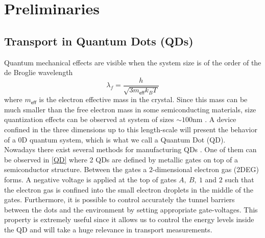 \chapter{Preliminaries}




\section{Transport in Quantum Dots (QDs)}



Quantum mechanical effects are visible when the system size is of
the order of the de Broglie wavelength \citep[(1.1)]{bimberg_quantum_1999}
\[
\lambda_{f}=\frac{h}{\sqrt{3m_{\mathsf{eff}}k_{B}T}}
\]
 where $m_{\mathsf{eff}}$ is the electron effective mass in the crystal.
Since this mass can be much smaller than the free electron mass in
some semiconducting materials, size quantization effects can be observed
at system of sizes $\sim100\mbox{nm}$ \citep[2.1]{sindel_numerical_2005}.
A device confined in the three dimensions up to this length-scale
will present the behavior of a $0$D quantum system, which is what
we call a Quantum Dot (QD).\\

Nowadays there exist several methods for manufacturing QDs \citep{bimberg_quantum_1999}.
One of them can be observed in \ref{QD} where 2 QDs are defined by
metallic gates on top of a semiconductor structure. Between the gates
a $2$-dimensional electron gas (2DEG) forms. A negative voltage is
applied at the top of gates $A,\ B,\ 1$ and $2$ such that the electron
gas is confined into the small electron droplets in the middle of
the gates. Furthermore, it is possible to control accurately the tunnel
barriers between the dots and the environment by setting appropriate
gate-voltages. This property is extremely useful since it allows us
to control the energy levels inside the QD and will take a huge relevance
in transport measurements. \\

